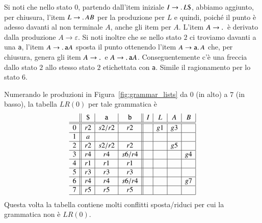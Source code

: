 %
Si noti che nello stato $0$, partendo dall'item iniziale
$I\to.\, L\mathtt{\$}$, abbiamo aggiunto, per chiusura, l'item
$L\to.\, AB$ per la produzione per $L$ e quindi, poich\'e il punto
\`e adesso davanti al non terminale $A$, anche gli item per $A$.
L'item $A\to.\,$ \`e derivato dalla produzione $A\to\varepsilon$.
Si noti inoltre che se nello stato $2$ ci troviamo davanti a una \texttt{a},
l'item $A\to.\,\mathtt{a}A$ sposta il punto ottenendo l'item
$A\to\mathtt{a}.\, A$ che, per chiusura, genera gli item
$A\to.\,$ e $A\to.\,\mathtt{a}A$. Conseguentemente c'\`e una freccia
dallo stato $2$ allo stesso stato $2$ etichettata con \texttt{a}.
Simile il ragionamento per lo stato $6$.

Numerando le produzioni in Figura~\ref{fig:grammar_lists} da $0$
(in alto) a $7$ (in basso), la tabella $\mathit{LR}(0)$ per tale grammatica \`e
%
\begin{equation}\label{eq:lr0_lists_table}
\begin{array}{c||c|c|c||c|c|c|c|}
  & \mathtt{\$} & \mathtt{a} & \mathtt{b} & I  & L  & A  & B  \\\hline\hline
0 & r2          & s2/r2      & r2         &    & g1 & g3 &    \\\hline
1 & a           &            &            &    &    &    &    \\\hline
2 & r2          & s2/r2      & r2         &    &    & g5 &    \\\hline
3 & r4          & r4         & s6/r4      &    &    &    & g4 \\\hline
4 & r1          & r1         & r1         &    &    &    &    \\\hline
5 & r3          & r3         & r3         &    &    &    &    \\\hline
6 & r4          & r4         & s6/r4      &    &    &    & g7 \\\hline
7 & r5          & r5         & r5         &    &    &    &    \\\hline
\end{array}
\end{equation}
%
Questa volta la tabella contiene molti conflitti sposta/riduci per cui
la grammatica non \`e $\mathit{LR}(0)$.
%
